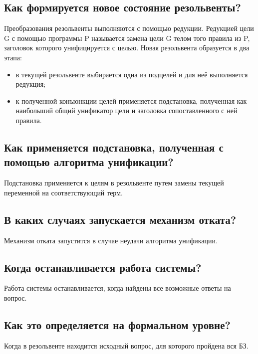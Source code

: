 \subsection*{Как формируется новое состояние резольвенты?}

Преобразования резольвенты выполняются с помощью редукции. Редукцией цели G с помощью программы P называется замена цели G телом того правила из P, заголовок которого унифицируется с целью. Новая резольвента образуется в два этапа:
\begin{itemize}
    \item в текущей резольвенте выбирается одна из подцелей и для неё выполняется редукция;
    \item к полученной конъюнкции целей применяется подстановка, полученная как наибольший общий унификатор цели и заголовка сопоставленного с ней правила.
\end{itemize}

\subsection*{Как применяется подстановка, полученная с помощью алгоритма унификации?}

Подстановка применяется к целям в резольвенте путем замены текущей переменной на соответствующий терм.

\subsection*{В каких случаях запускается механизм отката?}

Механизм отката запустится в случае неудачи алгоритма унификации.

\subsection*{Когда останавливается работа системы?}

Работа системы останавливается, когда найдены все возможные ответы на вопрос.

\subsection*{Как это определяется на формальном уровне?}

Когда в резольвенте находится исходный вопрос, для которого пройдена вся БЗ.